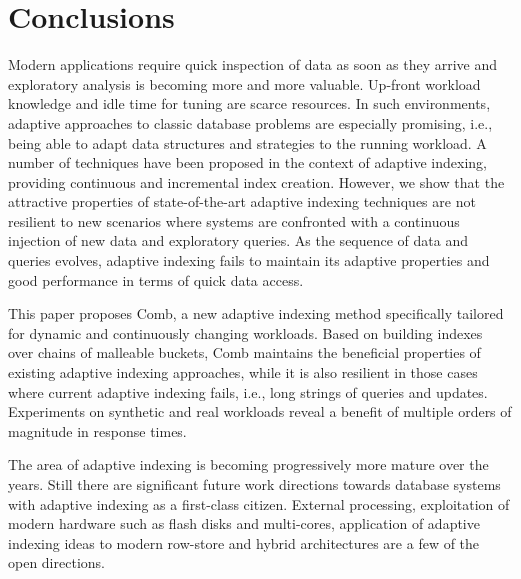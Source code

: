 \section{Conclusions}
\label{sec:conclusion}
Modern applications require quick inspection of data as soon as they arrive and exploratory analysis is becoming more and more valuable. Up-front workload knowledge and idle time for tuning are scarce resources. In such environments, adaptive approaches to classic database problems are especially promising, i.e., being able to adapt data structures and strategies to the running workload. A number of techniques have been proposed in the context of adaptive indexing, providing continuous and incremental index creation. However, we show that the attractive properties of state-of-the-art adaptive indexing techniques are not resilient to new scenarios where systems are confronted with a continuous injection of new data and exploratory queries. As the sequence of data and queries evolves, adaptive indexing fails to maintain its adaptive properties and good performance in terms of quick data access.

This paper proposes Comb, a new adaptive indexing method specifically tailored for dynamic and continuously changing workloads. Based on building indexes over chains of malleable buckets, Comb maintains the beneficial properties of existing adaptive indexing approaches, while it is also resilient in those cases where current adaptive indexing fails, i.e., long strings of queries and updates. Experiments on synthetic and real workloads reveal a benefit of multiple orders of magnitude in response times.

The area of adaptive indexing is becoming progressively more mature over the years. Still there are significant future work directions towards database systems with adaptive indexing as a first-class citizen. External processing, exploitation of modern hardware such as flash disks and multi-cores, application of adaptive indexing ideas to modern row-store and hybrid architectures are a few of the open directions.
 

